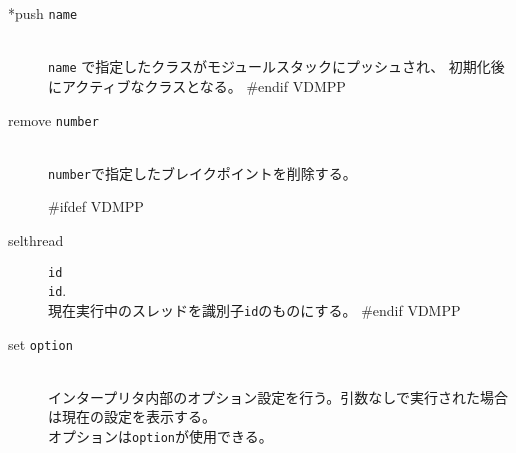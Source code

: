 \documentclass[\pformat,12pt]{article}
\begin{document}
\begin{description}
\item[*push {\tt name}] \mbox{}\\
  {\tt name} で指定したクラスがモジュールスタックにプッシュされ、
  初期化後にアクティブなクラスとなる。
#endif VDMPP

\item[remove \mbox{\texttt{number}}]
\mbox{}\\
  \texttt{number}で指定したブレイクポイントを削除する。

#ifdef VDMPP
\item[selthread]\texttt{id}\mbox{}\\
  \texttt{id}.\\
  現在実行中のスレッドを識別子\texttt{id}のものにする。 
#endif VDMPP

\item[set {\tt option} ]\mbox{}\\
  インタープリタ内部のオプション設定を行う。引数なしで実行された場合は現在の設定を表示する。\\
  オプションは{\tt option}\/が使用できる。
  

\end{description}
\end{document}
